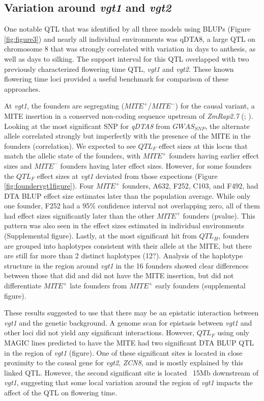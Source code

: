 \documentclass[article,9pt,twocolumn,twoside]{rilabRxiv}
\begin{document}
\subsection{Variation around \emph{vgt1} and \emph{vgt2}}
One notable QTL that was identified by all three models using BLUPs (Figure \ref{fig:figure3}) and nearly all individual environments was qDTA8, a large QTL on chromosome 8 that was strongly correlated with variation in days to anthesis, as well as days to silking.
The support interval for this QTL overlapped with two previously characterized flowering time QTL, \emph{vgt1} and \emph{vgt2}.
These known flowering time loci provided a useful benchmark for comparison of these approaches.


At \emph{vgt1}, the founders are segregating ($MITE^+$/$MITE^-$) for the causal variant, a MITE insertion in a conserved non-coding sequence upstream of \emph{ZmRap2.7} (\cite{Salvi}; \cite{Castelletti}).
Looking at the most significant SNP for \emph{qDTA8} from $GWAS_{SNP}$, the alternate allele correlated strongly but imperfectly with the presence of the MITE in the founders (correlation).
We expected to see $QTL_F$ effect sizes at this locus that match the allelic state of the founders, with $MITE^+$ founders having earlier effect sizes and $MITE^-$ founders having later effect sizes.
However, for some founders the $QTL_F$ effect sizes at \emph{vgt1} deviated from those expections (Figure \ref{fig:foundervgt1figure}).
Four $MITE^+$ founders, A632, F252, C103, and F492, had DTA BLUP effect size estimates later than the population average.
While only one founder, F252 had a 95\% confidence interval not overlapping zero, all of them had effect sizes significantly later than the other $MITE^+$ founders (pvalue).
This pattern was also seen in the effect sizes estimated in individual environments (Supplemental figure).
Lastly, at the most significant hit from $QTL_H$, founders are grouped into haplotypes consistent with their allele at the MITE, but there are still far more than 2 distinct haplotypes (12?).
Analysis of the haplotype structure in the region around \emph{vgt1} in the 16 founders showed clear differences between those that did and did not have the MITE insertion, but did not differentiate $MITE^+$ late founders from $MITE^+$ early founders (supplemental figure).

These results suggested to use that there may be an epistatic interaction between \emph{vgt1} and the genetic background.
A genome scan for epistasis between \emph{vgt1} and other loci did not yield any significant interactions.
However, $QTL_F$ using only MAGIC lines predicted to have the MITE had two significant DTA BLUP QTL in the region of \emph{vgt1} (figure).
One of these significant sites is located in close proximity to the causal gene for \emph{vgt2}, \emph{ZCN8}, and is mostly explained by this linked QTL.
However, the second significant site is located ~15Mb downstream of \emph{vgt1}, suggesting that some local variation around the region of \emph{vgt1} impacts the affect of the QTL on flowering time.
\end{document}
